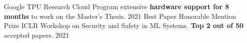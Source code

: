 
\begin{cvhonors}

  \cvhonor
    {Google TPU Research Cloud Program} %
    {extensive \textbf{hardware support for 8 months} to work on the Master's Thesis.} %
    {} %
    {2021} %
  \cvhonor
    {Best Paper Honorable Mention Prize} %
    {ICLR Workshop on Security and Safety in ML Systems. \textbf{Top 2 out of 50} accepted papers.} %
    {} %
    {2021} %

\end{cvhonors}
